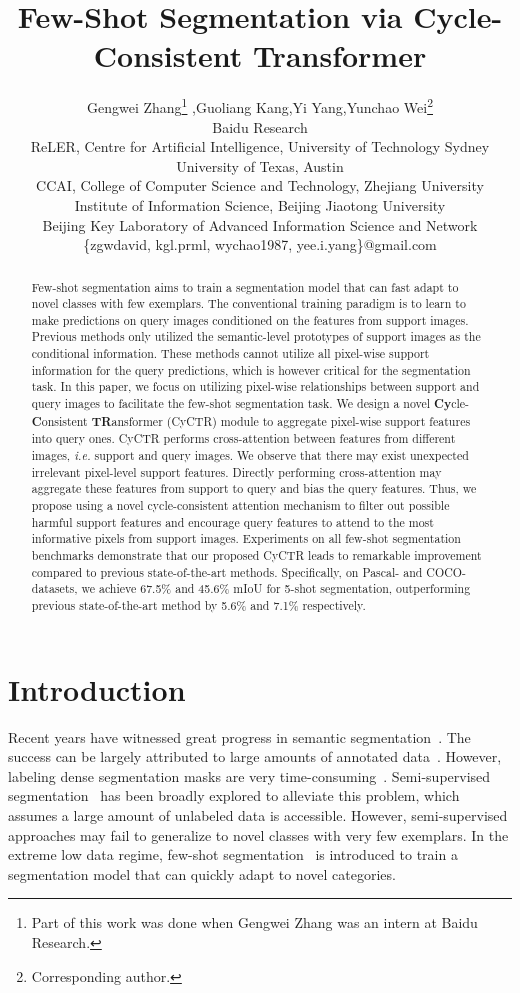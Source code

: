\documentclass{article}
\title{Few-Shot Segmentation via Cycle-Consistent Transformer}
\author{
  Gengwei Zhang\thanks{Part of this work was done when Gengwei Zhang was an intern at Baidu Research.} ,\quad Guoliang Kang,\quad Yi Yang,\quad Yunchao Wei\thanks{Corresponding author.} \\
   Baidu Research \\ 
   ReLER, Centre for Artificial Intelligence, University of Technology Sydney\\
   University of Texas, Austin\\
   CCAI, College of Computer Science and Technology, Zhejiang University \\
   Institute of Information Science, Beijing Jiaotong University \\
   Beijing Key Laboratory of Advanced Information Science and Network \\
  \small{\{zgwdavid, kgl.prml, wychao1987, yee.i.yang\}@gmail.com}
}
\begin{document}
\maketitle

\begin{abstract}
  Few-shot segmentation aims to train a segmentation model that can fast adapt to novel classes with few exemplars. 
  The conventional training paradigm is to learn to make predictions on query images conditioned on the features from support images.
  Previous methods only utilized the semantic-level prototypes of support images 
  as the conditional information. 
  These methods cannot utilize all pixel-wise support information for the query predictions, which is however critical for the segmentation task.
  In this paper, we focus on utilizing pixel-wise relationships between support and query images to facilitate the 
  few-shot segmentation task. 
  We design a novel \textbf{Cy}cle-\textbf{C}onsistent \textbf{TR}ansformer (CyCTR) module to aggregate pixel-wise support features 
  into query ones. 
  CyCTR performs cross-attention between features from different images, \emph{i.e.} support and query images.
  We observe that there may exist unexpected irrelevant pixel-level support features. 
  Directly performing cross-attention may aggregate these features from support to query and bias the query features.
  Thus, we propose using a novel cycle-consistent attention mechanism to filter out possible harmful support features and encourage query features to attend to the most informative pixels from support images. 
  Experiments on all few-shot segmentation benchmarks demonstrate that our proposed CyCTR leads to remarkable improvement compared to previous state-of-the-art methods. 
  Specifically, on Pascal- and COCO- datasets, we achieve 67.5\% and 45.6\% mIoU for 5-shot segmentation, outperforming previous state-of-the-art method by 5.6\% and 7.1\% respectively. 
  
\end{abstract}

\section{Introduction}
\label{sec:intro}

Recent years have witnessed great progress in semantic segmentation~\cite{long2015fcn,chen2017deeplab,pspnet}. 
The success can be largely attributed to large amounts of annotated data~\cite{zhou2017ade20k,mscoco}.
However, labeling dense segmentation masks are very time-consuming~\cite{zhang2020interactive}. Semi-supervised segmentation~\cite{huang2018weakly,wei2018revisiting,wei2017object} has been broadly explored to alleviate this problem, which assumes a large amount of unlabeled data is accessible. However, semi-supervised approaches may fail to generalize to novel classes with very few exemplars. In the extreme low data regime, few-shot segmentation~\cite{shaban2017oslsm,wang2019panet} is introduced to train a segmentation model that can quickly adapt to novel categories. 
\end{document}
